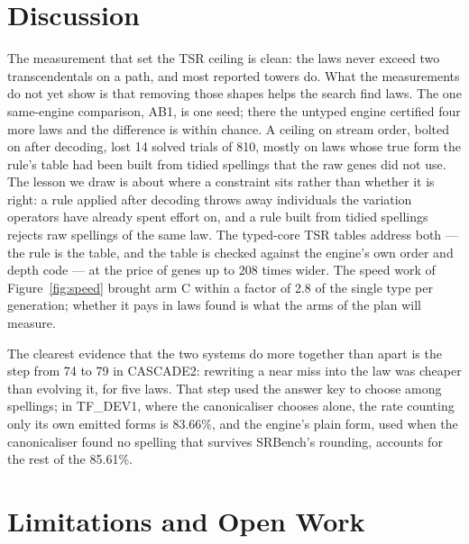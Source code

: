 \documentclass[sigconf,nonacm]{acmart}
\begin{document}
\section{Discussion}
\label{sec:discussion}

The measurement that set the TSR ceiling is clean: the laws never exceed two
transcendentals on a path, and most reported towers do. What the measurements do
not yet show is that removing those shapes helps the search find laws. The one
same-engine comparison, AB1, is one seed; there the untyped engine certified
four more laws and the difference is within chance. A ceiling on stream order,
bolted on after decoding, lost 14 solved trials of 810, mostly on laws whose
true form the rule's table had been built from tidied spellings that the raw
genes did not use. The lesson we draw is about where a constraint sits rather
than whether it is right: a rule applied after decoding throws away individuals
the variation operators have already spent effort on, and a rule built from
tidied spellings rejects raw spellings of the same law. The typed-core TSR
tables address both --- the rule is the table, and the table is checked against
the engine's own order and depth code --- at the price of genes up to 208 times
wider. The speed work of Figure~\ref{fig:speed} brought arm C within a factor
of 2.8 of the single type per generation; whether it pays in laws found is what
the arms of the plan will measure.

The clearest evidence that the two systems do more together than apart is the
step from 74 to 79 in CASCADE2: rewriting a near miss into the law was cheaper
than evolving it, for five laws. That step used the answer key to choose among
spellings; in TF\_DEV1, where the canonicaliser chooses alone, the rate counting
only its own emitted forms is 83.66\%, and the engine's plain form, used when
the canonicaliser found no spelling that survives SRBench's rounding, accounts
for the rest of the 85.61\%.

\section{Limitations and Open Work}
\label{sec:limits}
\end{document}
